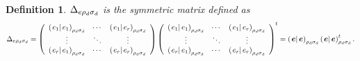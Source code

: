 \documentclass[aps,preprint]{revtex4}
\newtheorem{definition}[theorem]{Definition}
\begin{document}
\begin{enumerate}
\begin{definition}
${\Large \Delta }_{e\rho _{d}\sigma _{d}}$ is the symmetric matrix defined
as 
\begin{equation}
{\Large \Delta }_{e\rho _{d}\sigma _{d}}=\left( 
\begin{array}{ccc}
\left( \left. e_{1}\right\vert e_{1}\right) _{\rho _{d}\sigma _{d}} & \cdots
& \left( \left. e_{1}\right\vert e_{r}\right) _{\rho _{d}\sigma _{d}} \\ 
\vdots & \ddots & \vdots \\ 
\left( \left. e_{r}\right\vert e_{1}\right) _{\rho _{d}\sigma _{d}} & \cdots
& \left( \left. e_{r}\right\vert e_{r}\right) _{\rho _{d}\sigma _{d}}%
\end{array}%
\right) \left( 
\begin{array}{ccc}
\left( \left. e_{1}\right\vert e_{1}\right) _{\rho _{d}\sigma _{d}} & \cdots
& \left( \left. e_{1}\right\vert e_{r}\right) _{\rho _{d}\sigma _{d}} \\ 
\vdots & \ddots & \vdots \\ 
\left( \left. e_{r}\right\vert e_{1}\right) _{\rho _{d}\sigma _{d}} & \cdots
& \left( \left. e_{r}\right\vert e_{r}\right) _{\rho _{d}\sigma _{d}}%
\end{array}%
\right) ^{t}=\left( \left. \boldsymbol{e}\right\vert \boldsymbol{e}\right)
_{\rho _{d}\sigma _{d}}\left( \left. \boldsymbol{e}\right\vert \boldsymbol{e}%
\right) _{\rho _{d}\sigma _{d}}^{t}.
\end{equation}
\end{definition}


\end{enumerate}
\end{document}
